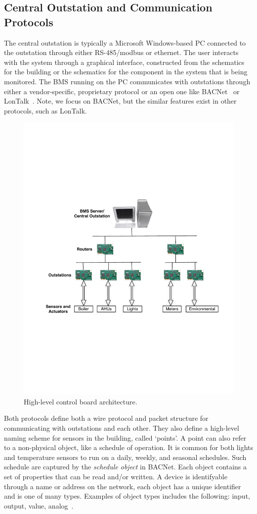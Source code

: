 \subsection{Central Outstation and Communication Protocols}
The central outstation is typically a Microsoft Windows-based PC connected to the outstation through either RS-485/modbus or ethernet.
The user interacts with the system through a graphical interface, constructed from the schematics for the building or the schematics
for the component in the system that is being monitored.  The BMS running on the PC communicates with outstations through either a 
vendor-specific, proprietary protocol or an open one like BACNet~\cite{Bacnet} or LonTalk~\cite{LonTalk}.  Note, 
we focus on BACNet, but the similar features exist in other protocols, such as LonTalk.  

\begin{figure}[h!] %
\centering
\includegraphics[width=0.50\columnwidth]{figs/BMS_network}
\caption{High-level control board architecture.}
\label{fig:bms_network}
\end{figure}

Both protocols define both a wire protocol and packet structure for communicating with outstations and each other.  They also define a high-level
naming scheme for sensors in the building, called `points'.  A point can also refer to a non-physical object, like a schedule of operation.
It is common for both lights and temperature sensors to run on a daily, weekly, and seasonal schedules.  Such schedule are captured
by the \emph{schedule object} in BACNet.  
Each object contains a set of properties that can 
be read and/or written.  A device is identifyable through a name or address on the network, each object has a unique identifier and is one of
many types.  Examples of object types includes the following: input, output, value, analog~\cite{Bacnet}.  

